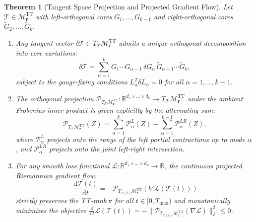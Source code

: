 \documentclass[11pt,a4paper,reqno]{amsart}
\newtheorem{theorem}{Theorem}[section]
\theoremstyle{definition}
\numberwithin{equation}{section}
\providecommand{\R}{\mathbb{R}}
\newcommand{\dif}{\,\mathrm{d}}
\providecommand{\R}{\mathbb{R}}
\begin{document}
\begin{theorem}[Tangent Space Projection and Projected Gradient Flow]
\label{thm:tt_tangent_proj}
Let $\mathcal{T} \in \mathcal{M}_{\mathbf{r}}^{\mathrm{TT}}$ with left-orthogonal cores $G_1, \dots, G_{k-1}$ and right-orthogonal cores $\widetilde{G}_2, \dots, \widetilde{G}_k$. 
\begin{enumerate}[label=(\roman*)]
    \item Any tangent vector $\delta \mathcal{T} \in T_{\mathcal{T}} \mathcal{M}_{\mathbf{r}}^{\mathrm{TT}}$ admits a unique orthogonal decomposition into core variations:
    \begin{equation}
        \delta \mathcal{T} = \sum_{\alpha=1}^k G_1 \cdots G_{\alpha-1} \, \delta G_\alpha \, \widetilde{G}_{\alpha+1} \cdots \widetilde{G}_k,
    \end{equation}
    subject to the gauge-fixing conditions $L_\alpha^T \delta L_\alpha = 0$ for all $\alpha = 1, \dots, k-1$.
    \item The orthogonal projection $\mathcal{P}_{T_{\mathcal{T}} \mathcal{M}_{\mathbf{r}}^{\mathrm{TT}}} \colon \R^{d_1 \times \dots \times d_k} \to T_{\mathcal{T}} \mathcal{M}_{\mathbf{r}}^{\mathrm{TT}}$ under the ambient Frobenius inner product is given explicitly by the alternating sum:
    \begin{equation}
        \label{eq:tt_proj_formula}
        \mathcal{P}_{T_{\mathcal{T}} \mathcal{M}_{\mathbf{r}}^{\mathrm{TT}}}(Z) = \sum_{\alpha=1}^k \mathcal{P}_{\alpha}^L(Z) - \sum_{\alpha=1}^{k-1} \mathcal{P}_{\alpha}^{LR}(Z),
    \end{equation}
    where $\mathcal{P}_{\alpha}^L$ projects onto the range of the left partial contractions up to mode $\alpha$, and $\mathcal{P}_{\alpha}^{LR}$ projects onto the joint left-right intersection.
    \item For any smooth loss functional $\mathcal{L} \colon \R^{d_1 \times \dots \times d_k} \to \R$, the continuous projected Riemannian gradient flow:
    \begin{equation}
        \label{eq:tt_flow}
        \frac{\dif \mathcal{T}(t)}{\dif t} = - \mathcal{P}_{T_{\mathcal{T}(t)} \mathcal{M}_{\mathbf{r}}^{\mathrm{TT}}}\left( \nabla \mathcal{L}(\mathcal{T}(t)) \right)
    \end{equation}
    strictly preserves the TT-rank $\mathbf{r}$ for all $t \in [0, T_{\max})$ and monotonically minimizes the objective $\frac{\dif}{\dif t}\mathcal{L}(\mathcal{T}(t)) = -\|\mathcal{P}_{T_{\mathcal{T}(t)} \mathcal{M}_{\mathbf{r}}^{\mathrm{TT}}}(\nabla \mathcal{L})\|_F^2 \le 0$.
\end{enumerate}
\end{theorem}
\end{document}
